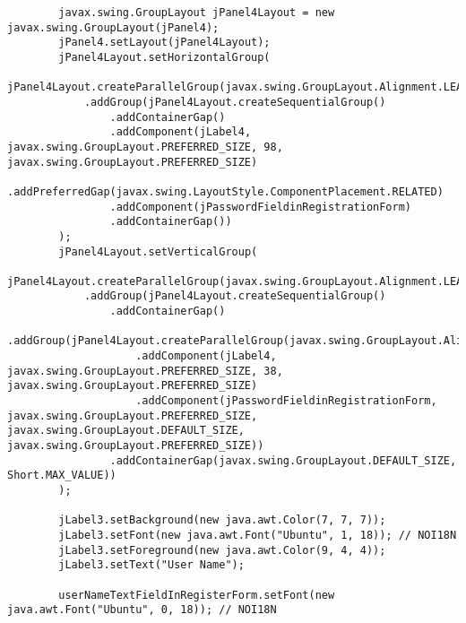 \documentclass[12pt,a4paper]{article}
\begin{document}
\begin{lstlisting}
        javax.swing.GroupLayout jPanel4Layout = new javax.swing.GroupLayout(jPanel4);
        jPanel4.setLayout(jPanel4Layout);
        jPanel4Layout.setHorizontalGroup(
            jPanel4Layout.createParallelGroup(javax.swing.GroupLayout.Alignment.LEADING)
            .addGroup(jPanel4Layout.createSequentialGroup()
                .addContainerGap()
                .addComponent(jLabel4, javax.swing.GroupLayout.PREFERRED_SIZE, 98, javax.swing.GroupLayout.PREFERRED_SIZE)
                .addPreferredGap(javax.swing.LayoutStyle.ComponentPlacement.RELATED)
                .addComponent(jPasswordFieldinRegistrationForm)
                .addContainerGap())
        );
        jPanel4Layout.setVerticalGroup(
            jPanel4Layout.createParallelGroup(javax.swing.GroupLayout.Alignment.LEADING)
            .addGroup(jPanel4Layout.createSequentialGroup()
                .addContainerGap()
                .addGroup(jPanel4Layout.createParallelGroup(javax.swing.GroupLayout.Alignment.BASELINE)
                    .addComponent(jLabel4, javax.swing.GroupLayout.PREFERRED_SIZE, 38, javax.swing.GroupLayout.PREFERRED_SIZE)
                    .addComponent(jPasswordFieldinRegistrationForm, javax.swing.GroupLayout.PREFERRED_SIZE, javax.swing.GroupLayout.DEFAULT_SIZE, javax.swing.GroupLayout.PREFERRED_SIZE))
                .addContainerGap(javax.swing.GroupLayout.DEFAULT_SIZE, Short.MAX_VALUE))
        );

        jLabel3.setBackground(new java.awt.Color(7, 7, 7));
        jLabel3.setFont(new java.awt.Font("Ubuntu", 1, 18)); // NOI18N
        jLabel3.setForeground(new java.awt.Color(9, 4, 4));
        jLabel3.setText("User Name");

        userNameTextFieldInRegisterForm.setFont(new java.awt.Font("Ubuntu", 0, 18)); // NOI18N


\end{lstlisting}
\end{document}
